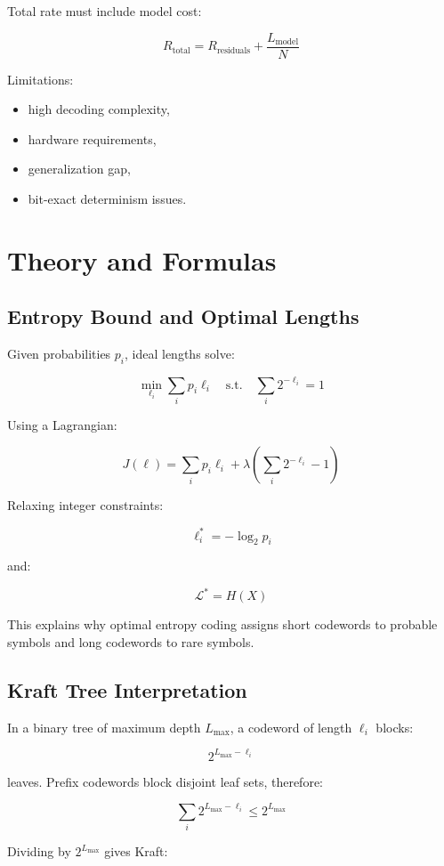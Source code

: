 Total rate must include model cost:

\[
R_{\text{total}}=R_{\text{residuals}}+\frac{L_{\text{model}}}{N}
\]

Limitations:

\begin{itemize}
  \item high decoding complexity,
  \item hardware requirements,
  \item generalization gap,
  \item bit-exact determinism issues.
\end{itemize}

\section{Theory and Formulas}

\subsection{Entropy Bound and Optimal Lengths}

Given probabilities $p_i$, ideal lengths solve:

\[
\min_{\ell_i}\sum_ip_i\ell_i
\quad\text{s.t.}\quad
\sum_i2^{-\ell_i}=1
\]

Using a Lagrangian:

\[
J(\ell)=\sum_ip_i\ell_i+\lambda\left(\sum_i2^{-\ell_i}-1\right)
\]

Relaxing integer constraints:

\[
\ell_i^*=-\log_2p_i
\]

and:

\[
\mathcal{L}^*=H(X)
\]

This explains why optimal entropy coding assigns short codewords to probable symbols and long codewords to rare symbols.

\subsection{Kraft Tree Interpretation}

In a binary tree of maximum depth $L_{\max}$, a codeword of length $\ell_i$ blocks:

\[
2^{L_{\max}-\ell_i}
\]

leaves. Prefix codewords block disjoint leaf sets, therefore:

\[
\sum_i2^{L_{\max}-\ell_i}\leq2^{L_{\max}}
\]

Dividing by $2^{L_{\max}}$ gives Kraft:

